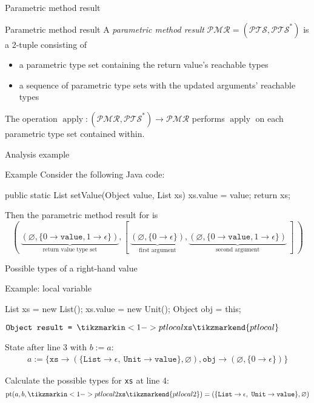 \documentclass{beamer}
\begin{document}
\begin{frame}{Parametric method result}
\begin{block}{Parametric method result}
A \emph{parametric method result} $\mathcal{PMR} = (\mathcal{PTS}, \mathcal{PTS}^*)$ is a 2-tuple consisting of 
\begin{itemize}
    \item a parametric type set containing the return value's reachable types
    \item a sequence of parametric type sets with the updated arguments' reachable types
\end{itemize}
The operation $\operatorname{apply} : (\mathcal{PMR}, \mathcal{PTS}^*) \to \mathcal{PMR}$ performs $\operatorname{apply}$ on each parametric type set contained within.
\end{block}
\end{frame}
\begin{frame}[fragile]{Analysis example}
\begin{block}{Example}
Consider the following Java code:
\begin{javacode}
public static List setValue(Object value, List xs) {
    xs.value = value;
    return xs;
}
\end{javacode}
Then the parametric method result for  is \[(\ \underbrace{(\varnothing, \{ 0 \to \mathtt{value}, 1 \to \epsilon\})}_\text{return value type set} , [\ \underbrace{(\varnothing, \{0 \to \epsilon\})}_\text{first argument}, \underbrace{(\varnothing, \{ 0 \to \mathtt{value}, 1 \to \epsilon\})}_\text{second argument}\ ]\ )\]
\end{block}
\end{frame}

\begin{frame}[fragile]{Possible types of a right-hand value}
\begin{block}{Example: local variable}
\begin{javacode}
List xs = new List();
xs.value = new Unit();
Object obj = this;
\end{javacode}
\vspace{-4pt}
$\texttt{Object result = } \tikzmarkin<1->{ptlocal}\mathtt{xs}\tikzmarkend{ptlocal}$

\vspace{5pt}
State after line 3 with $b := a$: 
\begin{align*} a := \{\mathtt{xs} \to (\{\mathtt{List} \to \epsilon,\ \mathtt{Unit} \to \mathtt{value} \}, \varnothing), \mathtt{obj} \to (\varnothing, \{ 0 \to \epsilon \}) \}
\end{align*}

\vspace{5pt} \hline \vspace{5pt}
Calculate the possible types for \texttt{xs} at line 4:
    \[ \operatorname{pt}(a,b,\tikzmarkin<1->{ptlocal2}\mathtt{xs}\tikzmarkend{ptlocal2}) = (\{ \mathtt{List} \to \epsilon,\ \mathtt{Unit} \to \mathtt{value} \}, \varnothing)\]
\end{block}
\end{frame}
\end{document}
